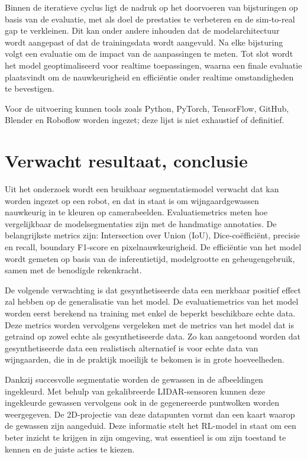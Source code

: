 Binnen de iteratieve cyclus ligt de nadruk op het doorvoeren van bijsturingen op basis van de evaluatie, met als doel de prestaties te verbeteren en de sim-to-real gap te verkleinen. Dit kan onder andere inhouden dat de modelarchitectuur wordt aangepast of dat de trainingsdata wordt aangevuld. Na elke bijsturing volgt een evaluatie om de impact van de aanpassingen te meten. Tot slot wordt het model geoptimaliseerd voor realtime toepassingen, waarna een finale evaluatie plaatsvindt om de nauwkeurigheid en efficiëntie onder realtime omstandigheden te bevestigen.

Voor de uitvoering kunnen tools zoals Python, PyTorch, TensorFlow, GitHub, Blender en Roboflow worden ingezet; deze lijst is niet exhaustief of definitief.

\section{Verwacht resultaat, conclusie}%
\label{sec:verwachte_resultaten}

Uit het onderzoek wordt een bruikbaar segmentatiemodel verwacht dat kan worden ingezet op een robot, en dat in staat is om wijngaardgewassen nauwkeurig in te kleuren op camerabeelden. Evaluatiemetrics meten hoe vergelijkbaar de modelsegmentaties zijn met de handmatige annotaties. De belangrijkste metrics zijn: Intersection over Union (IoU), Dice-coëfficiënt, precisie en recall, boundary F1-score en pixelnauwkeurigheid. De efficiëntie van het model wordt gemeten op basis van de inferentietijd, modelgrootte en geheugengebruik, samen met de benodigde rekenkracht.

De volgende verwachting is dat gesynthetiseerde data een merkbaar positief effect zal hebben op de generalisatie van het model. De evaluatiemetrics van het model worden eerst berekend na training met enkel de beperkt beschikbare echte data. Deze metrics worden vervolgens vergeleken met de metrics van het model dat is getraind op zowel echte als gesynthetiseerde data. Zo kan aangetoond worden dat gesynthetiseerde data een realistisch alternatief is voor echte data van wijngaarden, die in de praktijk moeilijk te bekomen is in grote hoeveelheden.

Dankzij succesvolle segmentatie worden de gewassen in de afbeeldingen ingekleurd. Met behulp van gekalibreerde LIDAR-sensoren kunnen deze ingekleurde gewassen vervolgens ook in de gegenereerde puntwolken worden weergegeven. De 2D-projectie van deze datapunten vormt dan een kaart waarop de gewassen zijn aangeduid. Deze informatie stelt het RL-model in staat om een beter inzicht te krijgen in zijn omgeving, wat essentieel is om zijn toestand te kennen en de juiste acties te kiezen.
